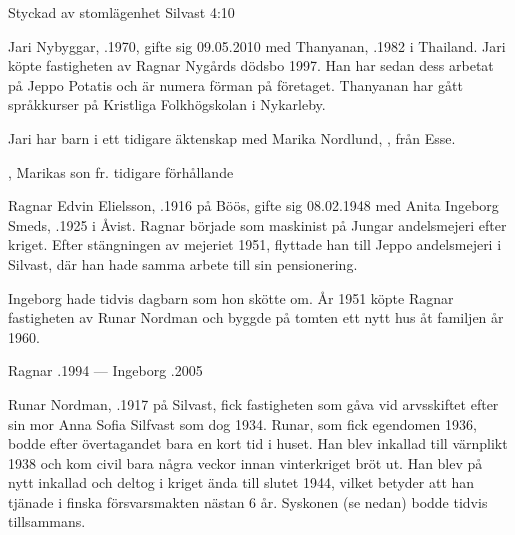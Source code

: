 Styckad av stomlägenhet Silvast 4:10


Jari  Nybyggar, .1970, gifte sig 09.05.2010 med Thanyanan, .1982 i Thailand. Jari köpte fastigheten av Ragnar Nygårds dödsbo 1997. Han har sedan dess arbetat på Jeppo Potatis och är numera förman på företaget. Thanyanan har gått språkkurser på Kristliga Folkhögskolan i Nykarleby.

Jari har barn i ett tidigare äktenskap med Marika Nordlund, , från Esse.
\begin{jhchildren}
  \item {}
  \item {}
  \item {}
  \item {}, Marikas son fr. tidigare förhållande
\end{jhchildren}


Ragnar Edvin Elielsson, .1916 på Böös, gifte sig 08.02.1948 med Anita Ingeborg Smeds, .1925 i Åvist. Ragnar började som maskinist på Jungar andelsmejeri efter kriget. Efter stängningen av mejeriet 1951, flyttade han till Jeppo andelsmejeri i Silvast, där han hade samma arbete till sin pensionering.

Ingeborg hade tidvis dagbarn som hon skötte om. År 1951 köpte Ragnar fastigheten av Runar Nordman och byggde på tomten ett nytt hus åt familjen år 1960.
\begin{jhchildren}
  \item {}
  \item {}
\end{jhchildren}

Ragnar .1994  ---  Ingeborg .2005




Runar Nordman, .1917 på Silvast, fick fastigheten som gåva vid arvsskiftet efter sin mor Anna Sofia Silfvast som dog 1934. Runar, som fick egendomen 1936, bodde efter övertagandet bara en kort tid i huset. Han blev inkallad till värnplikt 1938 och kom civil bara några veckor innan vinterkriget bröt ut. Han blev på nytt inkallad och deltog i kriget ända till slutet 1944, vilket betyder att han tjänade i finska försvarsmakten nästan 6 år. Syskonen (se nedan) bodde tidvis tillsammans.

